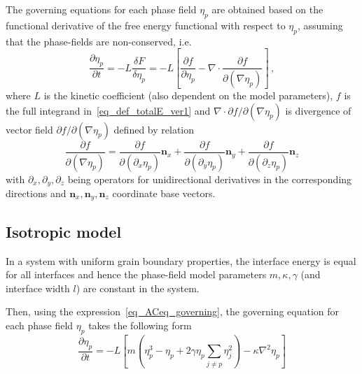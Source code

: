 The governing equations for each phase field $\eta_p$ are obtained based on the  functional derivative of the free energy functional with respect to $\eta_p$, assuming that the phase-fields are non-conserved, i.e. %
\begin{equation}
	\label{eq_ACeq_governing}
	\frac{\partial \eta_p}{\partial t} = -L\frac{\delta F}{\delta \eta_p} = -L \left[ \frac{\partial f}{\partial \eta_p} - \nabla\cdot\frac{\partial f}{\partial(\nabla \eta_p)} \right] \,,
\end{equation}
where $L$ is the kinetic coefficient (also dependent on the model parameters), $f$ is the full integrand in~\eqref{eq_def_totalE_ver1} and $\nabla\cdot\partial f/\partial(\nabla \eta_p)$ is divergence of vector field $\partial f/\partial(\nabla \eta_p)$ defined by relation
\begin{equation}
	\frac{\partial f}{\partial(\nabla \eta_p)} = \frac{\partial f}{\partial(\partial_x\eta_p)}\mathbf{n}_x + \frac{\partial f}{\partial(\partial_y \eta_p)}\mathbf{n}_y + \frac{\partial f}{\partial(\partial_z \eta_p)}\mathbf{n}_z
\end{equation}
with $\partial_x,\partial_y,\partial_z$ being operators for unidirectional derivatives in the corresponding directions and $\mathbf{n}_x,\mathbf{n}_y,\mathbf{n}_z$ coordinate base vectors. 

	\subsection{Isotropic model}
	\label{sec_Models}
	In a system with uniform grain boundary properties, the interface energy is equal for all interfaces and hence the phase-field model parameters $m,\kappa, \gamma$ (and interface width $l$) are constant in the system.
	
	Then, using the expression~\eqref{eq_ACeq_governing}, the governing equation for each phase field $\eta_p$ takes the following form %
	\begin{equation}
		\frac{\partial \eta_p}{\partial t} = -L\left[ m\left( \eta_p^3-\eta_p +  2\gamma\eta_p\sum_{j\neq p}\eta_j^2 \right) - \kappa\nabla^2\eta_p \right] 
	\end{equation}
	
